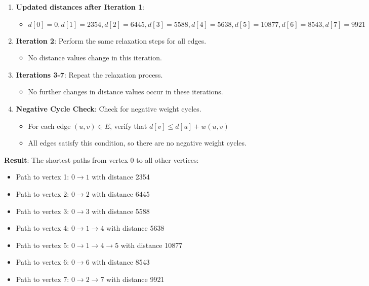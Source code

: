 \documentclass{article}
\theoremstyle{definition}
\begin{document}
\begin{enumerate}
   \item \textbf{Updated distances after Iteration 1}:
   \begin{itemize}
   \item $d[0] = 0, d[1] = 2354, d[2] = 6445, d[3] = 5588, d[4] = 5638, d[5] = 10877, d[6] = 8543, d[7] = 9921$
   \end{itemize}
   
   \item \textbf{Iteration 2}: Perform the same relaxation steps for all edges.
   \begin{itemize}
   \item No distance values change in this iteration.
   \end{itemize}
   
   \item \textbf{Iterations 3-7}: Repeat the relaxation process.
   \begin{itemize}
   \item No further changes in distance values occur in these iterations.
   \end{itemize}

\item \textbf{Negative Cycle Check}: Check for negative weight cycles.
   \begin{itemize}
   \item For each edge $(u,v) \in E$, verify that $d[v] \leq d[u] + w(u,v)$
   \item All edges satisfy this condition, so there are no negative weight cycles.
   \end{itemize}
\end{enumerate}

\noindent\textbf{Result}: The shortest paths from vertex 0 to all other vertices:
\begin{itemize}
\item Path to vertex 1: $0 \rightarrow 1$ with distance 2354
\item Path to vertex 2: $0 \rightarrow 2$ with distance 6445
\item Path to vertex 3: $0 \rightarrow 3$ with distance 5588
\item Path to vertex 4: $0 \rightarrow 1 \rightarrow 4$ with distance 5638
\item Path to vertex 5: $0 \rightarrow 1 \rightarrow 4 \rightarrow 5$ with distance 10877
\item Path to vertex 6: $0 \rightarrow 6$ with distance 8543
\item Path to vertex 7: $0 \rightarrow 2 \rightarrow 7$ with distance 9921
\end{itemize}
\end{document}
